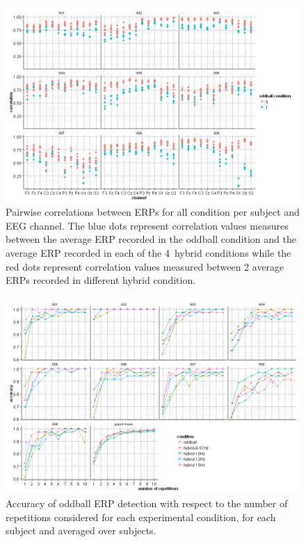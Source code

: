 %
\begin{figure}[t]
\centering
\includegraphics[width=\textwidth]{pix/correlationPoints}
\caption{
Pairwise correlations between ERPs for all condition per subject and EEG channel.
The blue dots represent correlation values measures between the average ERP recorded in the oddball condition and the average ERP recorded in each of the 4~hybrid conditions while the red dots represent correlation values measured between 2 average ERPs recorded in different hybrid condition.
}
\label{fig:corrERP}
\end{figure}

%
\begin{figure}[t]
\centering
\includegraphics[width=\textwidth]{pix/P3Accuracy}
\caption{
Accuracy of oddball ERP detection with respect to the number of repetitions considered for each experimental condition, for each subject and averaged over subjects.
}
\label{fig:P3Acc}
\end{figure}

